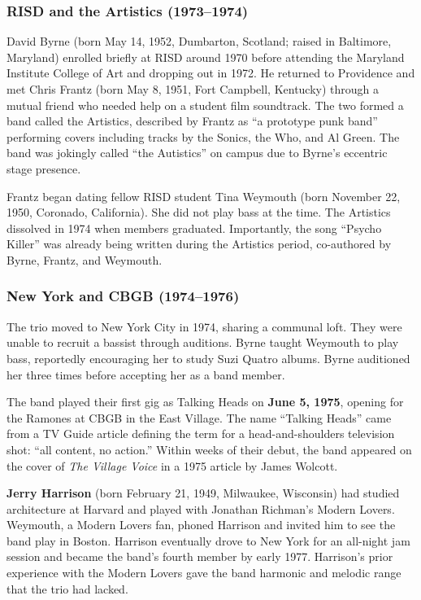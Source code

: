 \documentclass[11pt,letterpaper]{article}
\begin{document}
\subsubsection{RISD and the Artistics (1973--1974)}

David Byrne (born May 14, 1952, Dumbarton, Scotland; raised in Baltimore, Maryland) enrolled briefly at RISD around 1970 before attending the Maryland Institute College of Art and dropping out in 1972. He returned to Providence and met Chris Frantz (born May 8, 1951, Fort Campbell, Kentucky) through a mutual friend who needed help on a student film soundtrack. The two formed a band called the Artistics, described by Frantz as ``a prototype punk band'' performing covers including tracks by the Sonics, the Who, and Al Green. The band was jokingly called ``the Autistics'' on campus due to Byrne's eccentric stage presence.

Frantz began dating fellow RISD student Tina Weymouth (born November 22, 1950, Coronado, California). She did not play bass at the time. The Artistics dissolved in 1974 when members graduated. Importantly, the song ``Psycho Killer'' was already being written during the Artistics period, co-authored by Byrne, Frantz, and Weymouth.

\subsubsection{New York and CBGB (1974--1976)}

The trio moved to New York City in 1974, sharing a communal loft. They were unable to recruit a bassist through auditions. Byrne taught Weymouth to play bass, reportedly encouraging her to study Suzi Quatro albums. Byrne auditioned her three times before accepting her as a band member.

The band played their first gig as Talking Heads on \textbf{June 5, 1975}, opening for the Ramones at CBGB in the East Village. The name ``Talking Heads'' came from a TV Guide article defining the term for a head-and-shoulders television shot: ``all content, no action.'' Within weeks of their debut, the band appeared on the cover of \textit{The Village Voice} in a 1975 article by James Wolcott.

\textbf{Jerry Harrison} (born February 21, 1949, Milwaukee, Wisconsin) had studied architecture at Harvard and played with Jonathan Richman's Modern Lovers. Weymouth, a Modern Lovers fan, phoned Harrison and invited him to see the band play in Boston. Harrison eventually drove to New York for an all-night jam session and became the band's fourth member by early 1977. Harrison's prior experience with the Modern Lovers gave the band harmonic and melodic range that the trio had lacked.
\end{document}
